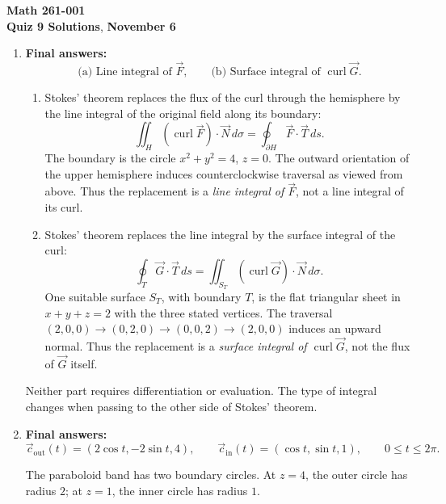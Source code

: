 \documentclass[12pt]{exam}
\newcommand{\class}{Math 261-001}
\newcommand{\examnum}{Quiz 9 Solutions}
\newcommand{\examdate}{November 6}
\begin{document}
\pagestyle{plain}
\thispagestyle{empty}

\noindent
\textbf{\class}\\
\textbf{\examnum}, \textbf{\examdate}

\vspace{8pt}
\small
\setlength{\abovedisplayskip}{6pt}
\setlength{\belowdisplayskip}{6pt}
\setlength{\abovedisplayshortskip}{3pt}
\setlength{\belowdisplayshortskip}{6pt}
\begin{enumerate}

\item \textbf{Final answers:}
\[
\boxed{\text{(a) Line integral of }\vec F},\qquad
\boxed{\text{(b) Surface integral of }\operatorname{curl}\vec G}.
\]

\begin{enumerate}[label=(\alph*)]
\item Stokes' theorem replaces the flux of the curl through the
hemisphere by the line integral of the original field along its boundary:
\[
\iint_H(\operatorname{curl}\vec F)\cdot\vec N\,d\sigma
=\oint_{\partial H}\vec F\cdot\vec T\,ds.
\]
The boundary is the circle $x^2+y^2=4$, $z=0$. The outward orientation
of the upper hemisphere induces counterclockwise traversal as viewed
from above. Thus the replacement is a \emph{line integral of $\vec F$},
not a line integral of its curl.

\item Stokes' theorem replaces the line integral by the surface integral
of the curl:
\[
\oint_T\vec G\cdot\vec T\,ds
=\iint_{S_T}(\operatorname{curl}\vec G)\cdot\vec N\,d\sigma.
\]
One suitable surface $S_T$, with boundary $T$, is the flat triangular sheet
in $x+y+z=2$ with the three stated vertices. The traversal
$(2,0,0)\to(0,2,0)\to(0,0,2)\to(2,0,0)$ induces an upward normal.
Thus the replacement is a \emph{surface integral of
$\operatorname{curl}\vec G$}, not the flux of $\vec G$ itself.
\end{enumerate}

Neither part requires differentiation or evaluation. The type of
integral changes when passing to the other side of Stokes' theorem.

\bigskip
\item \textbf{Final answers:}
\[
\boxed{\vec c_{\mathrm{out}}(t)=(2\cos t,-2\sin t,4)},
\qquad
\boxed{\vec c_{\mathrm{in}}(t)=(\cos t,\sin t,1)},
\qquad0\le t\le2\pi.
\]

\noindent\begin{minipage}[c]{0.53\linewidth}
The paraboloid band has two boundary circles. At $z=4$, the outer circle
has radius $2$; at $z=1$, the inner circle has radius $1$.


\end{minipage}
\end{enumerate}
\end{document}
